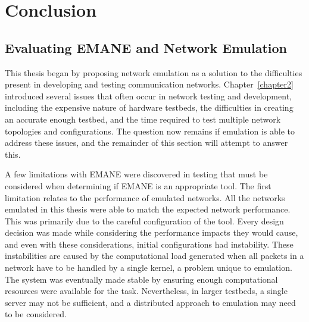 \chapter{Conclusion}
\label{conclusion}
\section{Evaluating EMANE and Network Emulation}
This thesis began by proposing network emulation as a solution to the difficulties present in developing and testing communication networks.
Chapter~\ref{chapter2} introduced several issues that often occur in network testing and development, including the expensive nature of hardware testbeds, the difficulties in creating an accurate enough testbed, and the time required to test multiple network topologies and configurations.
The question now remains if emulation is able to address these issues, and the remainder of this section will attempt to answer this.\par
A few limitations with EMANE were discovered in testing that must be considered when determining if EMANE is an appropriate tool.
The first limitation relates to the performance of emulated networks.
All the networks emulated in this thesis were able to match the expected network performance. This was primarily due to the careful configuration of the tool.
Every design decision was made while considering the performance impacts they would cause, and even with these considerations, initial configurations had instability.
These instabilities are caused by the computational load generated when all packets in a network have to be handled by a single kernel, a problem unique to emulation.
The system was eventually made stable by ensuring enough computational resources were available for the task.
Nevertheless, in larger testbeds, a single server may not be sufficient, and a distributed approach to emulation may need to be considered.
